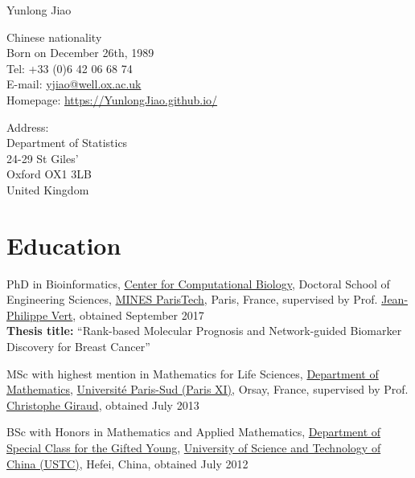 \documentclass[10pt,a4paper]{article}
\def\name{Yunlong Jiao}
\renewenvironment{itemize}{
  \begin{list}{}{
    \setlength{\leftmargin}{1.2em}
  }
}{
  \end{list}
}
\begin{document}
{\huge \name}


\vspace{0.15in}

\begin{minipage}[t]{0.5\textwidth}
  Chinese nationality \\
  Born on December 26th, 1989 \\
  Tel: +33 (0)6 42 06 68 74 \\
  E-mail: \href{mailto:yjiao@well.ox.ac.uk}{yjiao@well.ox.ac.uk} \\
  Homepage: \href{https://YunlongJiao.github.io/}{https://YunlongJiao.github.io/}
\end{minipage}
\begin{minipage}[t]{0.45\textwidth}
  Address: \\
  	Department of Statistics\\
  	24-29 St Giles'\\
  	Oxford OX1 3LB\\
  	United Kingdom
\end{minipage}

\section*{Education}

\begin{itemize}
\item PhD in Bioinformatics, \href{http://cbio.mines-paristech.fr/}{Center for Computational Biology}, Doctoral School of Engineering Sciences, \href{http://www.mines-paristech.fr/}{MINES ParisTech}, Paris, France, supervised by Prof. \href{http://cbio.mines-paristech.fr/~jvert/}{Jean-Philippe Vert}, obtained September 2017\\
\textbf{Thesis title:} ``Rank-based Molecular Prognosis and Network-guided Biomarker Discovery for Breast Cancer''
\item MSc with highest mention in Mathematics for Life Sciences, \href{https://www.math.u-psud.fr/}{Department of Mathematics}, \href{http://www.u-psud.fr/}{Universit\'{e} Paris-Sud (Paris XI)}, Orsay, France, supervised by Prof. \href{http://www.cmap.polytechnique.fr/~giraud/}{Christophe Giraud}, obtained July 2013
\item BSc with Honors in Mathematics and Applied Mathematics, \href{http://scgy.ustc.edu.cn/}{Department of Special Class for the Gifted Young}, \href{http://www.ustc.edu.cn/}{University of Science and Technology of China (USTC)}, Hefei, China, obtained July 2012
\end{itemize}
\end{document}
